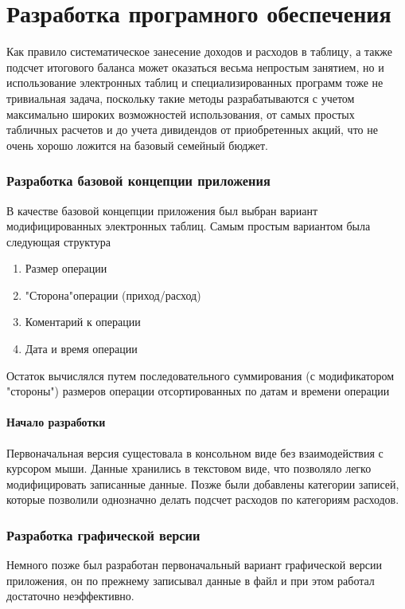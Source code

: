 \part{Разработка програмного обеспечения}

Как правило систематическое занесение доходов и расходов в таблицу, а
также подсчет итогового баланса может оказаться весьма непростым занятием, но и использование электронных таблиц и специализированных программ
тоже не тривиальная задача, поскольку такие методы разрабатываются с учетом максимально широких возможностей использования, от самых простых
табличных расчетов и до учета дивидендов от приобретенных акций, что не
очень хорошо ложится на базовый семейный бюджет.

\section{Разработка базовой концепции приложения}
В качестве базовой концепции приложения был выбран вариант модифицированных электронных таблиц. Самым простым вариантом была следующая структура
\begin{enumerate}
	\item Размер операции
	\item "Сторона"операции (приход/расход)
	\item Коментарий к операции
	\item Дата и время операции
\end{enumerate}

Остаток вычислялся путем последовательного суммирования (с модификатором "стороны") размеров операции отсортированных по датам и времени
операции

\subsection{Начало разработки}
Первоначальная версия сущестовала в консольном виде без взаимодействия с курсором мыши. Данные хранились в текстовом виде, что позволяло
легко модифицировать записанные данные. Позже были добавлены категории записей, которые позволили однозначно делать подсчет расходов по категориям расходов.

\section{Разработка графической версии}
Немного позже был разработан первоначальный вариант графической версии приложения, он по прежнему записывал данные в файл и при этом работал достаточно неэффективно.

